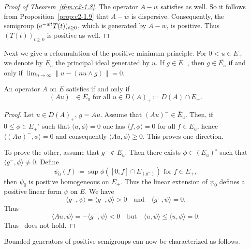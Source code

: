 \begin{proof}[Proof of Theorem~\ref{thm:c2-1.8}]
%
The operator $A - w$ satisfies  
as well.
So it follows from Proposition~\ref{prop:c2-1.9}   that $A - w$ is dispersive.
Consequently, the semigroup\/ $(\eu^{-wt}T(t))_{t \geq 0}$, which is generated by $A - w$, is positive.
Thus $(T(t))_{t \geq 0}$ is positive as well.
\end{proof}
Next we give a reformulation of the positive minimum principle.
For $0 < u \in E_{+}$ we denote by $E_{u}$ the principal ideal generated by $u$.
If\/ $g \in E_{+}$, then $g \in \overline{E_{u}}$ if and only if\/ $\lim_{n \to \infty} \|u - (n u \wedge g)\| = 0$.
\begin{lemma}\label{lem:c2-1.10}
%
An operator $A$ on $E$ satisfies  if and only if
\begin{equation}\label{eq:c2-1.8}
(Au)^{-} \in E_{u} \text{ for all } u \in D(A)_{+} \coloneq D(A) \cap E_{+}.
\end{equation}
\end{lemma}
\begin{proof}
Let $u \in D(A)_{+}$, $g = Au$.
Assume that $(Au)^{-} \in \overline{E}_{u}$.
Then, if\/ $0 \leq \phi \in E_{+}'$ such that $\langle u,\phi \rangle = 0$ one has $\langle f,\phi \rangle = 0$ for all $f \in \overline{E}_{u}$, hence $\langle (Au)^{-},\phi \rangle = 0$ and consequently $\langle Au,\phi \rangle \geq 0$.
This proves one direction.

To prove the other, assume that $g^{-} \not\in \overline{E}_{u}$.
Then there exists $\phi \in (E_{u})^{\circ}$ such that $\langle g^{-},\phi \rangle \not= 0$.
Define 
\[
\psi_{0}(f) \coloneq \sup \phi([0,f] \cap E_{(g^{-})}) \text{ for } f \in E_{+} ,
\]
then $\psi_{0}$ is positive homogeneous on $E_{+}$.
Thus the linear extension of\/ $\psi_{0}$ defines a positive linear form $\psi$ on $E$.
We have 
\[
\langle g^{-},\psi \rangle = \langle g^{-},\phi \rangle > 0 \quad\text{and}\quad \langle g^{+},\psi \rangle = 0 .
\]
Thus 
\[
\langle Au,\psi \rangle = - \langle g^{-},\psi \rangle < 0\quad\text{but} \quad\langle u,\psi \rangle \leq \langle u,\phi \rangle = 0 .
\]
Thus~   does not hold.
\end{proof}
Bounded generators of positive semigroups can now be characterized as follows.

